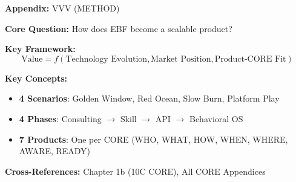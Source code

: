 
\begin{abstract}
This appendix addresses the fundamental strategic question: \textbf{How does EBF transition from consulting methodology to scalable AI-embedded products?} We develop a technological roadmap with four distinct scenarios, analyze EBF's strategic positioning in each, define the product options matrix mapping 10C COREs to revenue models, and chart the productizing journey from today's consulting practice to tomorrow's Behavioral AI platform.
\end{abstract}


\begin{tcolorbox}[colback=blue!5!white, colframe=blue!75!black,
    title=Quick Reference: Appendix VVV]
\textbf{Appendix:} VVV (METHOD)


\textbf{Core Question:} How does EBF become a scalable product?

\textbf{Key Framework:}
\begin{equation}
\text{Value} = f(\text{Technology Evolution}, \text{Market Position}, \text{Product-CORE Fit})
\end{equation}

\textbf{Key Concepts:}
\begin{itemize}[nosep]
\item \textbf{4 Scenarios}: Golden Window, Red Ocean, Slow Burn, Platform Play
\item \textbf{4 Phases}: Consulting $\to$ Skill $\to$ API $\to$ Behavioral OS
\item \textbf{7 Products}: One per CORE (WHO, WHAT, HOW, WHEN, WHERE, AWARE, READY)
\end{itemize}

\textbf{Cross-References:} Chapter 1b (10C CORE), All CORE Appendices
\end{tcolorbox}



